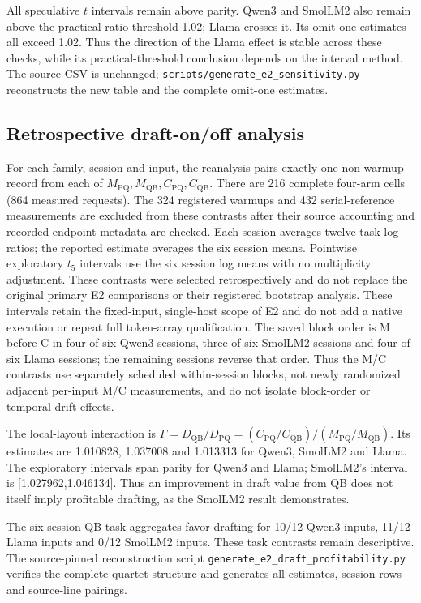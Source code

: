 All speculative $t$ intervals remain above parity. Qwen3 and SmolLM2 also remain above the practical ratio threshold 1.02; Llama crosses it. Its omit-one estimates all exceed 1.02. Thus the direction of the Llama effect is stable across these checks, while its practical-threshold conclusion depends on the interval method. The source CSV is unchanged; \texttt{scripts/generate\_e2\_sensitivity.py} reconstructs the new table and the complete omit-one estimates.


\subsection{Retrospective draft-on/off analysis}
\label{supp:e2draft}
For each family, session and input, the reanalysis pairs exactly one non-warmup record from each of $M_{\mathrm{PQ}},M_{\mathrm{QB}},C_{\mathrm{PQ}},C_{\mathrm{QB}}$. There are 216 complete four-arm cells (864 measured requests). The 324 registered warmups and 432 serial-reference measurements are excluded from these contrasts after their source accounting and recorded endpoint metadata are checked. Each session averages twelve task log ratios; the reported estimate averages the six session means. Pointwise exploratory $t_5$ intervals use the six session log means with no multiplicity adjustment. These contrasts were selected retrospectively and do not replace the original primary E2 comparisons or their registered bootstrap analysis. These intervals retain the fixed-input, single-host scope of E2 and do not add a native execution or repeat full token-array qualification. The saved block order is M before C in four of six Qwen3 sessions, three of six SmolLM2 sessions and four of six Llama sessions; the remaining sessions reverse that order. Thus the M/C contrasts use separately scheduled within-session blocks, not newly randomized adjacent per-input M/C measurements, and do not isolate block-order or temporal-drift effects.

The local-layout interaction is $\Gamma=D_{\mathrm{QB}}/D_{\mathrm{PQ}}=(C_{\mathrm{PQ}}/C_{\mathrm{QB}})/(M_{\mathrm{PQ}}/M_{\mathrm{QB}})$. Its estimates are 1.010828, 1.037008 and 1.013313 for Qwen3, SmolLM2 and Llama. The exploratory intervals span parity for Qwen3 and Llama; SmolLM2's interval is [1.027962,1.046134]. Thus an improvement in draft value from QB does not itself imply profitable drafting, as the SmolLM2 result demonstrates.

The six-session QB task aggregates favor drafting for 10/12 Qwen3 inputs, 11/12 Llama inputs and 0/12 SmolLM2 inputs. These task contrasts remain descriptive. The source-pinned reconstruction script \texttt{generate\_e2\_draft\_profitability.py} verifies the complete quartet structure and generates all estimates, session rows and source-line pairings.

